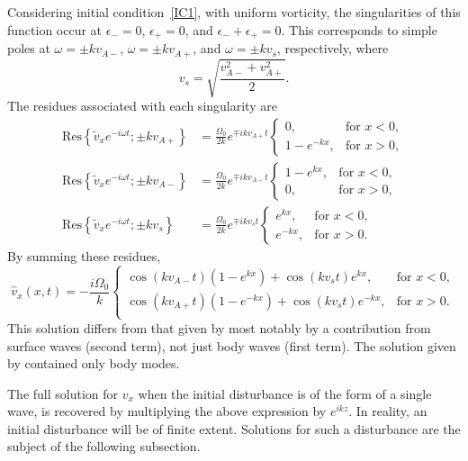 \documentclass[12pt]{../style-files/ociamthesis}
\begin{document}
Considering initial condition~\ref{IC1}, with uniform vorticity, the singularities of this function occur at $\epsilon_- = 0$, $\epsilon_+ = 0$, and $\epsilon_- + \epsilon_+ = 0$. This corresponds to simple poles at $\omega = \pm kv_{A-}$, $\omega = \pm kv_{A+}$, and $\omega = \pm kv_s$, respectively, where
\begin{equation}
v_s = \sqrt{\frac{v_{A-}^2 + v_{A+}^2}{2}}.
\end{equation}
The residues associated with each singularity are
\begin{align}
\mathrm{Res}\left\{\tilde{v}_x e^{-i\omega t}; \pm kv_{A+}\right\} &= \frac{\Omega_0}{2k} e^{\mp ikv_{A+}t}
\begin{cases}
0, & \text{for  } x < 0, \\
1 - e^{-kx}, & \text{for  } x > 0, 
\end{cases} \\
\mathrm{Res}\left\{\tilde{v}_x e^{-i\omega t}; \pm kv_{A-}\right\} &= \frac{\Omega_0}{2k} e^{\mp ikv_{A-}t}
\begin{cases}
1 - e^{kx}, & \text{for  } x < 0, \\
0, & \text{for  } x > 0,
\end{cases} \\
\mathrm{Res}\left\{\tilde{v}_x e^{-i\omega t}; \pm kv_{s}\right\} &= \frac{\Omega_0}{2k} e^{\mp ikv_st} 
\begin{cases}
e^{kx}, & \text{for  } x < 0, \\
e^{-kx}, & \text{for  } x > 0.
\end{cases}
\end{align}
By summing these residues,
\begin{equation}
\hat{v}_x(x, t) = -\frac{i\Omega_0}{k} \begin{cases}
\cos(kv_{A-}t)\left(1-e^{kx}\right) + \cos(kv_st)e^{kx}, & \text{for  } x<0, \\
\cos(kv_{A+}t)\left(1-e^{-kx}\right) + \cos(kv_st)e^{-kx}, & \text{for  } x>0. \\
\end{cases}
\label{sol int}
\end{equation}
This solution differs from that given by \cite{rae_etal81} most notably by a contribution from surface waves (second term), not just body waves (first term). The solution given by \cite{rae_etal81} contained only body modes.

The full solution for $v_x$ when the initial disturbance is of the form of a single wave, is recovered by multiplying the above expression by $e^{ikz}$. In reality, an initial disturbance will be of finite extent. Solutions for such a disturbance are the subject of the following subsection.
\end{document}
